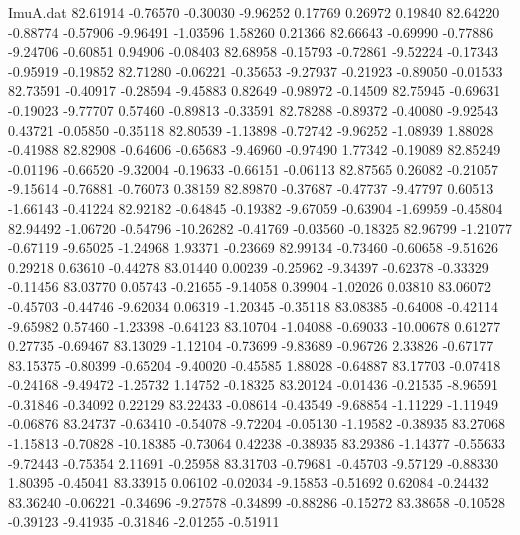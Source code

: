 \begin{filecontents}{ImuA.dat}
  82.61914   -0.76570   -0.30030   -9.96252    0.17769    0.26972    0.19840
  82.64220   -0.88774   -0.57906   -9.96491   -1.03596    1.58260    0.21366
  82.66643   -0.69990   -0.77886   -9.24706   -0.60851    0.94906   -0.08403
  82.68958   -0.15793   -0.72861   -9.52224   -0.17343   -0.95919   -0.19852
  82.71280   -0.06221   -0.35653   -9.27937   -0.21923   -0.89050   -0.01533
  82.73591   -0.40917   -0.28594   -9.45883    0.82649   -0.98972   -0.14509
  82.75945   -0.69631   -0.19023   -9.77707    0.57460   -0.89813   -0.33591
  82.78288   -0.89372   -0.40080   -9.92543    0.43721   -0.05850   -0.35118
  82.80539   -1.13898   -0.72742   -9.96252   -1.08939    1.88028   -0.41988
  82.82908   -0.64606   -0.65683   -9.46960   -0.97490    1.77342   -0.19089
  82.85249   -0.01196   -0.66520   -9.32004   -0.19633   -0.66151   -0.06113
  82.87565    0.26082   -0.21057   -9.15614   -0.76881   -0.76073    0.38159
  82.89870   -0.37687   -0.47737   -9.47797    0.60513   -1.66143   -0.41224
  82.92182   -0.64845   -0.19382   -9.67059   -0.63904   -1.69959   -0.45804
  82.94492   -1.06720   -0.54796  -10.26282   -0.41769   -0.03560   -0.18325
  82.96799   -1.21077   -0.67119   -9.65025   -1.24968    1.93371   -0.23669
  82.99134   -0.73460   -0.60658   -9.51626    0.29218    0.63610   -0.44278
  83.01440    0.00239   -0.25962   -9.34397   -0.62378   -0.33329   -0.11456
  83.03770    0.05743   -0.21655   -9.14058    0.39904   -1.02026    0.03810
  83.06072   -0.45703   -0.44746   -9.62034    0.06319   -1.20345   -0.35118
  83.08385   -0.64008   -0.42114   -9.65982    0.57460   -1.23398   -0.64123
  83.10704   -1.04088   -0.69033  -10.00678    0.61277    0.27735   -0.69467
  83.13029   -1.12104   -0.73699   -9.83689   -0.96726    2.33826   -0.67177
  83.15375   -0.80399   -0.65204   -9.40020   -0.45585    1.88028   -0.64887
  83.17703   -0.07418   -0.24168   -9.49472   -1.25732    1.14752   -0.18325
  83.20124   -0.01436   -0.21535   -8.96591   -0.31846   -0.34092    0.22129
  83.22433   -0.08614   -0.43549   -9.68854   -1.11229   -1.11949   -0.06876
  83.24737   -0.63410   -0.54078   -9.72204   -0.05130   -1.19582   -0.38935
  83.27068   -1.15813   -0.70828  -10.18385   -0.73064    0.42238   -0.38935
  83.29386   -1.14377   -0.55633   -9.72443   -0.75354    2.11691   -0.25958
  83.31703   -0.79681   -0.45703   -9.57129   -0.88330    1.80395   -0.45041
  83.33915    0.06102   -0.02034   -9.15853   -0.51692    0.62084   -0.24432
  83.36240   -0.06221   -0.34696   -9.27578   -0.34899   -0.88286   -0.15272
  83.38658   -0.10528   -0.39123   -9.41935   -0.31846   -2.01255   -0.51911

\end{filecontents}
